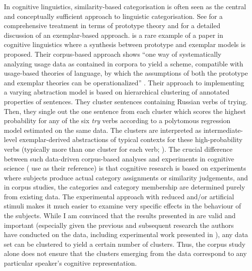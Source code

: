 In cognitive linguistics, similarity-based categorisation is often seen as the central and conceptually sufficient approach to linguistic categorisation.
See \citet{Taylor2003} for a comprehensive treatment in terms of prototype theory and \citet{Taylor2012} for a detailed discussion of an exemplar-based approach.
\citet{DivjakArppe2013} is a rare example of a paper in cognitive linguistics where a synthesis between prototype and exemplar models is proposed.
Their corpus-based approach shows ``one way of systematically analyzing usage data as contained in corpora to yield a scheme, compatible with usage-based theories of language, by which the assumptions of both the prototype and exemplar theories can be operationalized'' \citep[267]{DivjakArppe2013}.
Their approach to implementing a varying abstraction model \citep[254--260]{DivjakArppe2013} is based on hierarchical clustering of annotated properties of sentences.
They cluster sentences containing Russian verbs of trying.
Then, they single out the one sentence from each cluster which scores the highest probability for any of the six \textit{try} verbs according to a polytomous regression model estimated on the same data.
The clusters are interpreted as intermediate-level exemplar-derived abstractions of typical contexts for these high-probability verbs (typically more than one cluster for each verb; \citealp[255--256]{DivjakArppe2013}).
The crucial difference between such data-driven corpus-based analyses and experiments in cognitive science (\citealp{DivjakArppe2013} use \citealp{VerbeemenEa2007} as their reference) is that cognitive research is based on experiments where subjects produce actual category assignments or similarity judgements, and in corpus studies, the categories and category membership are determined purely from existing data.
The experimental approach with reduced and\slash or artificial stimuli makes it much easier to examine very specific effects in the behaviour of the subjects.
While I am convinced that the results presented in \citet{DivjakArppe2013} are valid and important (especially given the previous and subsequent research the authors have conducted on the data, including experimental work presented in \citealp{DivjakGries2008,DivjakEa2016}), any data set can be clustered to yield a certain number of clusters.
Thus, the corpus study alone does not ensure that the clusters emerging from the data correspond to any particular speaker's cognitive representation.

